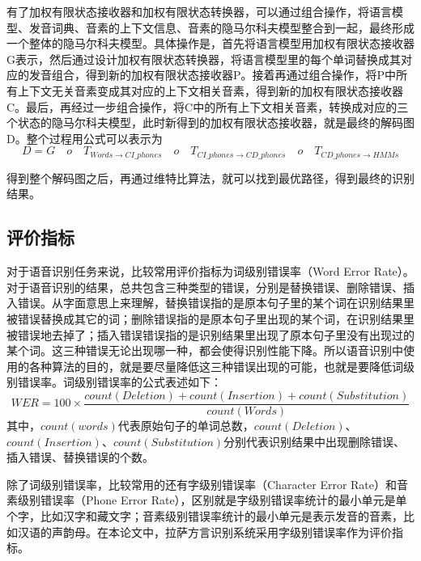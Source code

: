 有了加权有限状态接收器和加权有限状态转换器，可以通过组合操作，将语言模型、发音词典、音素的上下文信息、音素的隐马尔科夫模型整合到一起，最终形成一个整体的隐马尔科夫模型。具体操作是，首先将语言模型用加权有限状态接收器G表示，然后通过设计加权有限状态转换器，将语言模型里的每个单词替换成其对应的发音组合，得到新的加权有限状态接收器P。接着再通过组合操作，将P中所有上下文无关音素变成其对应的上下文相关音素，得到新的加权有限状态接收器C。最后，再经过一步组合操作，将C中的所有上下文相关音素，转换成对应的三个状态的隐马尔科夫模型，此时新得到的加权有限状态接收器，就是最终的解码图D。整个过程用公式可以表示为\begin{equation}D=G\quad o \quad T_{Words\rightarrow CI\_phones} \quad o \quad T_{CI\_phones\rightarrow CD\_phones} \quad o \quad T_{CD\_phones \rightarrow HMMs}\end{equation}

得到整个解码图之后，再通过维特比算法，就可以找到最优路径，得到最终的识别结果。

\subsection{评价指标}
对于语音识别任务来说，比较常用评价指标为词级别错误率（Word Error Rate）。对于语音识别的结果，总共包含三种类型的错误，分别是替换错误、删除错误、插入错误。从字面意思上来理解，替换错误指的是原本句子里的某个词在识别结果里被错误替换成其它的词；删除错误指的是原本句子里出现的某个词，在识别结果里被错误地去掉了；插入错误错误指的是识别结果里出现了原本句子里没有出现过的某个词。这三种错误无论出现哪一种，都会使得识别性能下降。所以语音识别中使用的各种算法的目的，就是要尽量降低这三种错误出现的可能，也就是要降低词级别错误率。词级别错误率的公式表述如下：
\begin{equation}WER=100\times\frac{count(Deletion)+count(Insertion)+count(Substitution)}{count(Words)}\end{equation}
其中，$count(words)$代表原始句子的单词总数，$count(Deletion)$、$count(Insertion)$、$count(Substitution)$分别代表识别结果中出现删除错误、插入错误、替换错误的个数。

除了词级别错误率，比较常用的还有字级别错误率（Character Error Rate）和音素级别错误率（Phone Error Rate），区别就是字级别错误率统计的最小单元是单个字，比如汉字和藏文字；音素级别错误率统计的最小单元是表示发音的音素，比如汉语的声韵母。在本论文中，拉萨方言识别系统采用字级别错误率作为评价指标。

